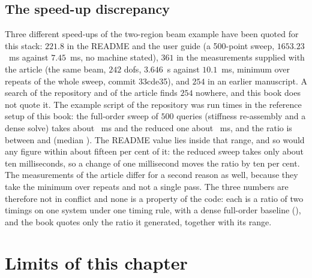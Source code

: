 \subsection{The speed-up discrepancy}\label{sec:vf-speed}
Three different speed-ups of the two-region beam example have been quoted for this stack: $221.8$ in the README and the user guide (a 500-point sweep, $1653.23$~ms against $7.45$~ms, no machine stated), $361$ in the measurements supplied with the article (the same beam, $242$ dofs, $3.646$~s against $10.1$~ms, minimum over repeats of the whole sweep, commit 33cde35), and $254$ in an earlier manuscript. A search of the repository and of the article finds $254$ nowhere, and this book does not quote it. The example script of the repository was run \cplRdRuns{} times in the reference setup of this book: the full-order sweep of $500$ queries (stiffness re-assembly and a dense solve) takes about \cplRdFomMs~ms and the reduced one about \cplRdRomMs~ms, and the ratio is between \cplRdMin{} and \cplRdMax{} (median \cplRdMed). The README value lies inside that range, and so would any figure within about fifteen per cent of it: the reduced sweep takes only about ten milliseconds, so a change of one millisecond moves the ratio by ten per cent. The measurements of the article differ for a second reason as well, because they take the minimum over repeats and not a single pass. The three numbers are therefore not in conflict and none is a property of the code: each is a ratio of two timings on one system under one timing rule, with a dense full-order baseline (), and the book quotes only the ratio it generated, together with its range.

\section{Limits of this chapter}\label{sec:vf-limits}

